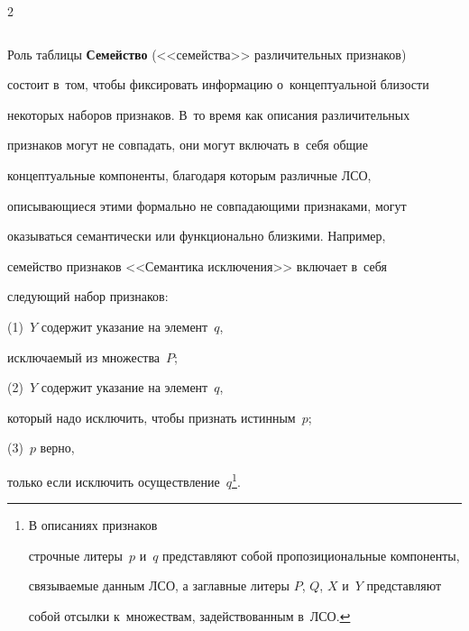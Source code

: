\begin{multicols}{2}
\begin{table}
\begin{center}
\begin{tabular}{|p{48mm}|p{28mm}|p{48mm}|p{28mm}|}
\hline


\end{tabular}


\end{center}





\end{table}


   


Роль таблицы \textbf{Семейство} (<<семейства>> различительных признаков) 


состоит в~том, чтобы фиксировать информацию о~концептуальной бли\-зости 


некоторых наборов признаков. В~то время как \mbox{описания} различительных 


признаков могут не совпадать, они могут вклю\-чать в~себя общие 


концептуальные компоненты, благодаря которым различные ЛСО, 


описывающиеся этими формально не совпадающими признаками, могут 


оказываться семантически или функционально близкими. Например, 


семейство признаков <<Семантика исключения>> включает в~себя 


следующий набор признаков: 






(1)~$Y$ содержит указание на элемент~$q$, 


ис\-клю\-ча\-емый из множества~$P$; 




(2)~$Y$ содержит указание на элемент~$q$, 


который надо исключить, чтобы признать истинным~$p$; 




(3)~$p$ верно, 


только если исключить осуществление~$q$\footnote{В описаниях признаков 


строчные литеры~$p$ и~$q$ представляют собой пропозициональные компоненты, 


связываемые данным ЛСО, а заглавные литеры $P$, $Q$, $X$ и~$Y$ представляют 


собой отсылки к~множествам, задействованным в~ЛСО.}.



\end{multicols}
